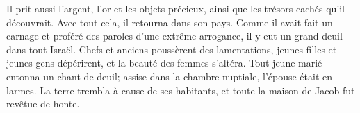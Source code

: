 Il prit aussi l’argent, l’or et les objets précieux,
	ainsi que les trésors cachés qu’il découvrait.
Avec tout cela, il retourna dans son pays.
Comme il avait fait un carnage et proféré des paroles d’une extrême arrogance,
	il y eut un grand deuil dans tout Israël.
Chefs et anciens poussèrent des lamentations,
	jeunes filles et jeunes gens dépérirent, et la beauté des femmes s’altéra.
Tout jeune marié entonna un chant de deuil;
	assise dans la chambre nuptiale, l’épouse était en larmes.
La terre trembla à cause de ses habitants,
	et toute la maison de Jacob fut revêtue de honte.
